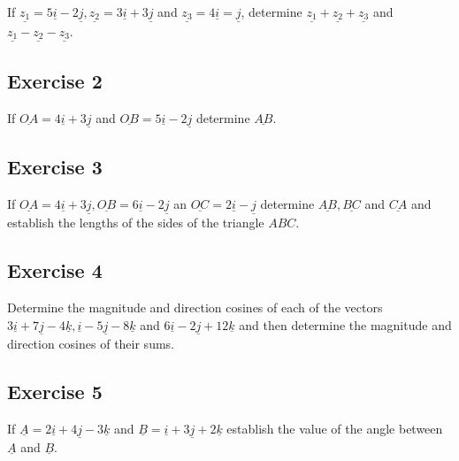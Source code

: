 \documentclass[
  11pt,
  oneside]{book}
\newcommand{\slide}{}
\theoremstyle{definition}
\theoremstyle{definition}
\theoremstyle{definition}
\theoremstyle{definition}
\theoremstyle{remark}
\begin{document}
If \(\underline{z_1} = 5\underline{i}-2\underline{j}, \underline{z_2} = 3\underline{i}+3\underline{j}\) and \(\underline{z_3}=4\underline{i}=\underline{j}\), determine \(\underline{z_1}+\underline{z_2}+\underline{z_3}\) and \(\underline{z_1}-\underline{z_2}-\underline{z_3}\).

\slide

\subsection*{Exercise 2}\label{exercise-2-13}

If \(\underline{OA}=4\underline{i}+3\underline{j}\) and \(\underline{OB}=5\underline{i}-2\underline{j}\) determine \(\underline{AB}\).

\slide

\subsection*{Exercise 3}\label{exercise-3-11}

If \(\underline{OA} = 4\underline{i}+3\underline{j}, \underline{OB}=6\underline{i}-2\underline{j}\) an \(\underline{OC}=2\underline{i}-\underline{j}\) determine \(\underline{AB}, \underline{BC}\) and \(\underline{CA}\) and establish the lengths of the sides of the triangle \(ABC\).

\slide

\subsection*{Exercise 4}\label{exercise-4-9}

Determine the magnitude and direction cosines of each of the vectors \(3\underline{i}+7\underline{j}-4\underline{k}, \underline{i}-5\underline{j}-8\underline{k}\) and \(6\underline{i}-2\underline{j}+12\underline{k}\) and then determine the magnitude and direction cosines of their sums.

\slide

\subsection*{Exercise 5}\label{exercise-5-7}

If \(\underline A=2\underline{i}+4\underline{j}-3\underline{k}\) and \(\underline B=\underline{i}+3\underline{j}+2\underline{k}\) establish the value of the angle between \(\underline A\) and \(\underline B\).
\end{document}
